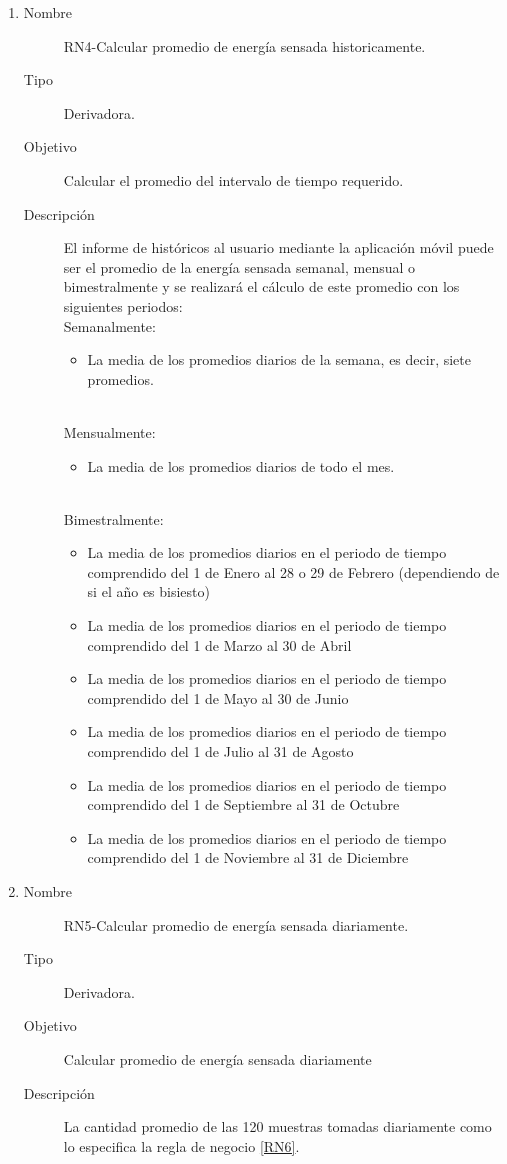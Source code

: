 \begin{enumerate}[label=RN\arabic*.]
\item \label{RN4}
		\begin{description}
			\item[Nombre] RN4-Calcular promedio de energía sensada historicamente.
			\item[Tipo] Derivadora.
			\item[Objetivo] Calcular el promedio del intervalo de tiempo requerido.
			\item[Descripción] El informe de históricos al usuario mediante la aplicación móvil puede ser el promedio de la energía sensada semanal, mensual o bimestralmente y se realizará el cálculo de este promedio con los siguientes periodos:
			\\ Semanalmente: 
			\begin{itemize}
				\item La media de los promedios diarios de la semana, es decir, siete promedios.
			\end{itemize}
			\\ Mensualmente: 
			\begin{itemize}
				\item La media de los promedios diarios de todo el mes.
			\end{itemize}
			\\ Bimestralmente: 
			\begin{itemize}
				\item La media de los promedios diarios en el periodo de tiempo comprendido del 1 de Enero al 28 o 29 de Febrero (dependiendo de si el año es bisiesto)
				\item La media de los promedios diarios en el periodo de tiempo comprendido del 1 de Marzo al 30 de Abril
				\item La media de los promedios diarios en el periodo de tiempo comprendido del 1 de Mayo al 30 de Junio
				\item La media de los promedios diarios en el periodo de tiempo comprendido del 1 de Julio al 31 de Agosto
				\item La media de los promedios diarios en el periodo de tiempo comprendido del 1 de Septiembre al 31 de Octubre
				\item La media de los promedios diarios en el periodo de tiempo comprendido del 1 de Noviembre al 31 de Diciembre
			\end{itemize}
		\end{description}

\item \label{RN5}
		\begin{description}
			\item[Nombre] RN5-Calcular promedio de energía sensada diariamente.
			\item[Tipo] Derivadora.
			\item[Objetivo] Calcular promedio de energía sensada diariamente
			\item[Descripción] La cantidad promedio de las 120 muestras tomadas diariamente como lo especifica la regla de negocio \ref{RN6}.
		\end{description}


\end{enumerate}
